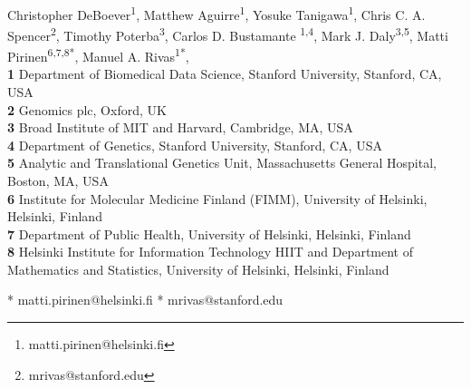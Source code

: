 
\usepackage{float}

\newcommand{\lorem}{{\bf LOREM}}
\newcommand{\ipsum}{{\bf IPSUM}}

\def\bs{\boldsymbol}
\def\Vy{\widehat{\textrm{V}}_Y}



\vspace*{0.2in}

\begin{flushleft}
{\Large
\textbf{} %
}
\newline
\\
\author{Christopher DeBoever$^{1}$, Matthew Aguirre$^{1}$, Yosuke Tanigawa$^{1}$, Chris C. A. Spencer$^{2}$, Timothy Poterba$^{3}$, Mark J. Daly$^{4,5}$, Matti Pirinen$^{5,6,7}$\thanks{matti.pirinen@helsinki.fi}, and Manuel A. Rivas$^{1}$\thanks{mrivas@stanford.edu}}
Christopher DeBoever\textsuperscript{1},
Matthew Aguirre\textsuperscript{1},
Yosuke Tanigawa\textsuperscript{1},
Chris C. A. Spencer\textsuperscript{2},
Timothy Poterba\textsuperscript{3},
Carlos D. Bustamante \textsuperscript{1,4},
Mark J. Daly\textsuperscript{3,5},
Matti Pirinen\textsuperscript{6,7,8*},
Manuel A. Rivas\textsuperscript{1*},
\\
\bigskip
\textbf{1} Department of Biomedical Data Science, Stanford University, Stanford, CA, USA
\\
\textbf{2} Genomics plc, Oxford, UK
\\
\textbf{3} Broad Institute of MIT and Harvard, Cambridge, MA, USA
\\
\textbf{4} Department of Genetics, Stanford University, Stanford, CA, USA
\\
\textbf{5} Analytic and Translational Genetics Unit, Massachusetts General Hospital, Boston, MA, USA
\\
\textbf{6} Institute for Molecular Medicine Finland (FIMM), University of Helsinki, Helsinki, Finland
\\
\textbf{7} Department of Public Health, University of Helsinki, Helsinki, Finland
\\
\textbf{8} Helsinki Institute for Information Technology HIIT and Department of Mathematics and Statistics, University of Helsinki, Helsinki, Finland
\bigskip

* matti.pirinen@helsinki.fi
\newline
* mrivas@stanford.edu

\end{flushleft}
